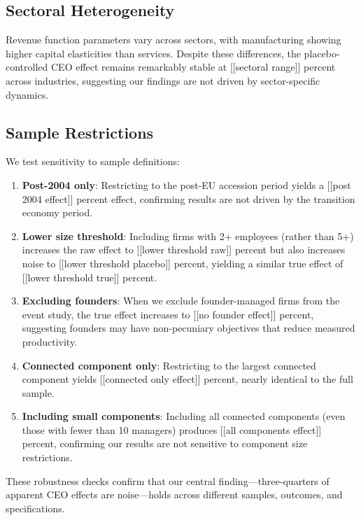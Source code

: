 \documentclass[11pt,a4paper]{article}
\begin{document}
\subsection{Sectoral Heterogeneity}

Revenue function parameters vary across sectors, with manufacturing showing higher capital elasticities than services. Despite these differences, the placebo-controlled CEO effect remains remarkably stable at [[sectoral range]] percent across industries, suggesting our findings are not driven by sector-specific dynamics.

\subsection{Sample Restrictions}

We test sensitivity to sample definitions:

\begin{enumerate}
\item \textbf{Post-2004 only}: Restricting to the post-EU accession period yields a [[post 2004 effect]] percent effect, confirming results are not driven by the transition economy period.

\item \textbf{Lower size threshold}: Including firms with 2+ employees (rather than 5+) increases the raw effect to [[lower threshold raw]] percent but also increases noise to [[lower threshold placebo]] percent, yielding a similar true effect of [[lower threshold true]] percent.

\item \textbf{Excluding founders}: When we exclude founder-managed firms from the event study, the true effect increases to [[no founder effect]] percent, suggesting founders may have non-pecuniary objectives that reduce measured productivity.

\item \textbf{Connected component only}: Restricting to the largest connected component yields [[connected only effect]] percent, nearly identical to the full sample.

\item \textbf{Including small components}: Including all connected components (even those with fewer than 10 managers) produces [[all components effect]] percent, confirming our results are not sensitive to component size restrictions.
\end{enumerate}

These robustness checks confirm that our central finding—three-quarters of apparent CEO effects are noise—holds across different samples, outcomes, and specifications.
\end{document}
